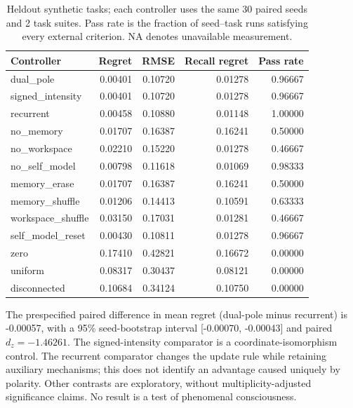 \begin{table}[htbp]
\centering\small
\begin{tabular}{lrrrr}
\hline
Controller & Regret & RMSE & Recall regret & Pass rate \\
\hline
dual\_pole & 0.00401 & 0.10720 & 0.01278 & 0.96667 \\
signed\_intensity & 0.00401 & 0.10720 & 0.01278 & 0.96667 \\
recurrent & 0.00458 & 0.10880 & 0.01148 & 1.00000 \\
no\_memory & 0.01707 & 0.16387 & 0.16241 & 0.50000 \\
no\_workspace & 0.02210 & 0.15220 & 0.01278 & 0.46667 \\
no\_self\_model & 0.00798 & 0.11618 & 0.01069 & 0.98333 \\
memory\_erase & 0.01707 & 0.16387 & 0.16241 & 0.50000 \\
memory\_shuffle & 0.01206 & 0.14413 & 0.10591 & 0.63333 \\
workspace\_shuffle & 0.03150 & 0.17031 & 0.01281 & 0.46667 \\
self\_model\_reset & 0.00430 & 0.10811 & 0.01278 & 0.96667 \\
zero & 0.17410 & 0.42821 & 0.16672 & 0.00000 \\
uniform & 0.08317 & 0.30437 & 0.08121 & 0.00000 \\
disconnected & 0.10684 & 0.34124 & 0.10750 & 0.00000 \\
\hline
\end{tabular}
\caption{Heldout synthetic tasks; each controller uses the same 30 paired seeds and 2 task suites. Pass rate is the fraction of seed--task runs satisfying every external criterion. NA denotes unavailable measurement.}
\end{table}
The prespecified paired difference in mean regret (dual-pole minus recurrent) is -0.00057, with a 95\% seed-bootstrap interval [-0.00070, -0.00043] and paired $d_z=-1.46261$. 
The signed-intensity comparator is a coordinate-isomorphism control. The recurrent comparator changes the update rule while retaining auxiliary mechanisms; this does not identify an advantage caused uniquely by polarity. Other contrasts are exploratory, without multiplicity-adjusted significance claims. No result is a test of phenomenal consciousness.
